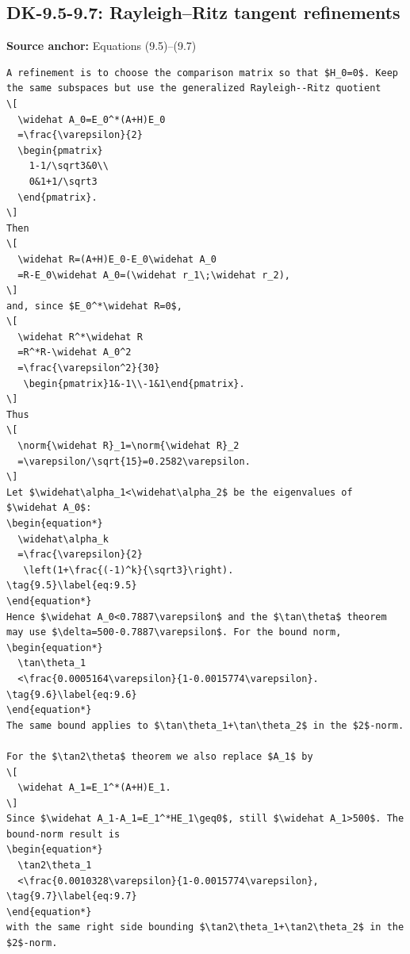 \subsection*{DK-9.5-9.7: Rayleigh–Ritz tangent refinements}
\noindent\textbf{Source anchor:} Equations (9.5)–(9.7)\\
\begin{verbatim}
A refinement is to choose the comparison matrix so that $H_0=0$. Keep the same subspaces but use the generalized Rayleigh--Ritz quotient
\[
  \widehat A_0=E_0^*(A+H)E_0
  =\frac{\varepsilon}{2}
  \begin{pmatrix}
    1-1/\sqrt3&0\\
    0&1+1/\sqrt3
  \end{pmatrix}.
\]
Then
\[
  \widehat R=(A+H)E_0-E_0\widehat A_0
  =R-E_0\widehat A_0=(\widehat r_1\;\widehat r_2),
\]
and, since $E_0^*\widehat R=0$,
\[
  \widehat R^*\widehat R
  =R^*R-\widehat A_0^2
  =\frac{\varepsilon^2}{30}
   \begin{pmatrix}1&-1\\-1&1\end{pmatrix}.
\]
Thus
\[
  \norm{\widehat R}_1=\norm{\widehat R}_2
  =\varepsilon/\sqrt{15}=0.2582\varepsilon.
\]
Let $\widehat\alpha_1<\widehat\alpha_2$ be the eigenvalues of $\widehat A_0$:
\begin{equation*}
  \widehat\alpha_k
  =\frac{\varepsilon}{2}
   \left(1+\frac{(-1)^k}{\sqrt3}\right).
\tag{9.5}\label{eq:9.5}
\end{equation*}
Hence $\widehat A_0<0.7887\varepsilon$ and the $\tan\theta$ theorem may use $\delta=500-0.7887\varepsilon$. For the bound norm,
\begin{equation*}
  \tan\theta_1
  <\frac{0.0005164\varepsilon}{1-0.0015774\varepsilon}.
\tag{9.6}\label{eq:9.6}
\end{equation*}
The same bound applies to $\tan\theta_1+\tan\theta_2$ in the $2$-norm.

For the $\tan2\theta$ theorem we also replace $A_1$ by
\[
  \widehat A_1=E_1^*(A+H)E_1.
\]
Since $\widehat A_1-A_1=E_1^*HE_1\geq0$, still $\widehat A_1>500$. The bound-norm result is
\begin{equation*}
  \tan2\theta_1
  <\frac{0.0010328\varepsilon}{1-0.0015774\varepsilon},
\tag{9.7}\label{eq:9.7}
\end{equation*}
with the same right side bounding $\tan2\theta_1+\tan2\theta_2$ in the $2$-norm.
\end{verbatim}

